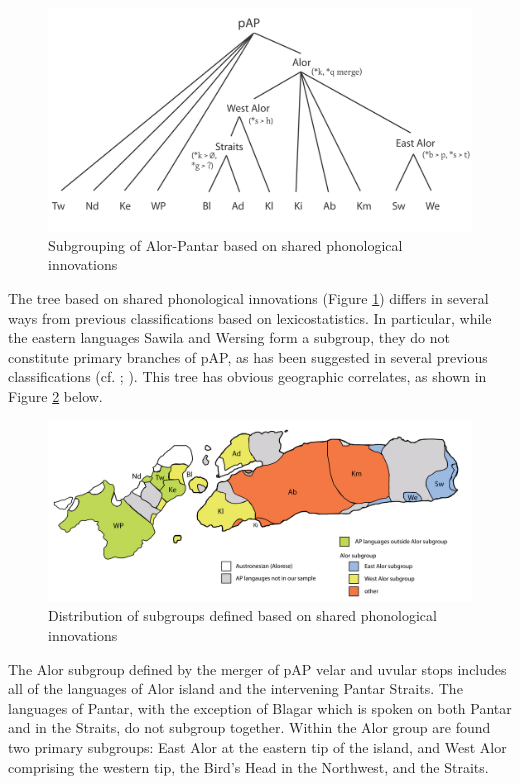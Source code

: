 \begin{figure}[p] 
\includegraphics[width=\textwidth]{figures/holton_ch2_fig1.png}
\caption{Subgrouping of Alor-Pantar based on shared phonological innovations}
\label{fig:2:1}
\end{figure}

The tree based on shared phonological innovations (Figure \ref{fig:2:1}) differs in several ways from previous classifications based on lexicostatistics. In particular, while the eastern languages Sawila and Wersing form a subgroup, they do not constitute primary branches of pAP, as has been suggested in several previous classifications (cf. \citealt{Wurm1982}; \citealt{Lewis2009}). This tree has obvious geographic correlates, as shown in Figure \ref{fig:2:2} below. 

\begin{figure}[p]
\includegraphics[width=\textwidth]{figures/holton_ch2_fig2.pdf}
\caption{Distribution of subgroups defined based on shared phonological innovations}
\label{fig:2:2}
\end{figure}

The Alor subgroup defined by the merger of pAP velar and uvular stops includes all of the languages of Alor island and the intervening Pantar Straits. The languages of Pantar, with the exception of Blagar which is spoken on both Pantar and in the Straits, do not subgroup together. Within the Alor group are found two primary subgroups: East Alor at the eastern tip of the island, and West Alor comprising the western tip, the Bird's Head in the Northwest, and the Straits.

